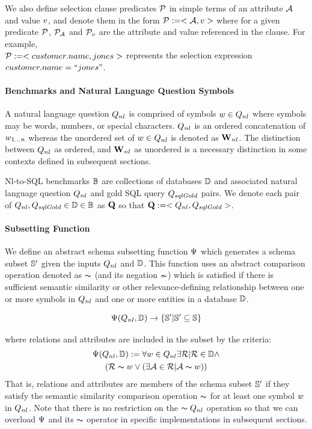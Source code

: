 We also define selection clause predicates $\mathcal{P}$ in simple terms of an attribute $\mathcal{A}$ and value $v$, and denote them in the form $\mathcal{P} := <\mathcal{A}, v>$ where for a given predicate $\mathcal{P}$, $\mathcal{P}_{\mathcal{A}}$ and $\mathcal{P}_v$ are the attribute and value referenced in the clause.
For example,\\ $\mathcal{P} := <customer.name, jones>$ represents the selection expression $customer.name = ``jones"$.

\paragraph{\textbf{Benchmarks and Natural Language Question Symbols}}
A natural language question $Q_{nl}$ is comprised of symbols $w \in Q_{nl}$ where symbols may be words, numbers, or special characters. 
$Q_{nl}$ is an ordered concatenation of $w_{1...n}$ whereas the unordered set of $w \in Q_{nl}$ is denoted as $\mathbf{W}_{nl}$. 
The distinction between $Q_{nl}$ as ordered, and $\mathbf{W}_{nl}$ as unordered is a necessary distinction in some contexts defined in subsequent sections.

Nl-to-SQL benchmarks $\mathbb{B}$ are collections of databases $\mathbb{D}$ and associated natural language question $Q_{nl}$ and gold SQL query $Q_{sqlGold}$ pairs.
We denote each pair of $Q_{nl}, Q_{sqlGold} \in \mathbb{D} \in \mathbb{B}$ as $\mathbf{Q}$ so that $\mathbf{Q} := <Q_{nl}, Q_{sqlGold}>$.

\paragraph{\textbf{Subsetting Function}}
We define an abstract schema subsetting function $\Psi$ which generates a schema subset $\mathbb{S}'$ given the inputs $Q_{nl}$ and $\mathbb{D}$. 
This function uses an abstract comparison operation denoted as $\thicksim$ (and its negation $\nsim$) which is satisfied if there is sufficient semantic similarity or other relevance-defining relationship between one or more symbols in $Q_{nl}$ and one or more entities in a database $\mathbb{D}$.

$$\Psi(Q_{nl}, \mathbb{D}) \rightarrow \{\mathbb{S}' | \mathbb{S}'\subseteq \mathbb{S}\}$$

where relations and attributes are included in the subset by the criteria:
\begin{multline}
\Psi(Q_{nl}, \mathbb{D}) := \forall w \in Q_{nl} \exists \mathcal{R} | \mathcal{R} \in \mathbb{D} \land \\
(\mathcal{R} \thicksim w \lor (\exists \mathcal{A} \in \mathcal{R} | \mathcal{A} \thicksim w))
\end{multline}
That is, relations and attributes are members of the schema subset $\mathbb{S}'$ if they satisfy the semantic similarity comparison operation $\thicksim$ for at least one symbol $w$ in $Q_{nl}$.
Note that there is no restriction on the $\thicksim Q_{nl}$ operation so that we can overload $\Psi $ and its $\thicksim$ operator in specific implementations in subsequent sections.




